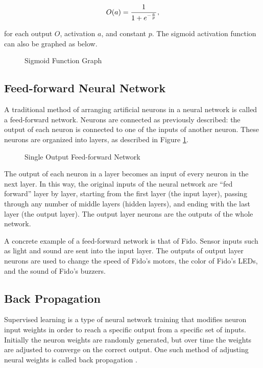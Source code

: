 \begin{equation}
	O(a) = \cfrac{1}{1+e^{-\frac{a}{p}}}
	\,,
\end{equation}

\noindent for each output $O$, activation $a$, and constant $p$. The sigmoid activation function can also be graphed as below.

\begin{figure}[ht]
	\centering
	
	\caption{Sigmoid Function Graph}
\end{figure}

\subsection{Feed-forward Neural Network}

A traditional method of arranging artificial neurons in a neural network is called a feed-forward network. Neurons are connected as previously described: the output of each neuron is connected to one of the inputs of another neuron. These neurons are organized into layers, as described in Figure \ref{fig:feedforward}.

\begin{figure}[ht]
	\centering
	
	\caption{Single Output Feed-forward Network}
	\label{fig:feedforward}
\end{figure}

The output of each neuron in a layer becomes an input of every neuron in the next layer. In this way, the original inputs of the neural network are ``fed forward'' layer by layer, starting from the first layer (the input layer), passing through any number of middle layers (hidden layers), and ending with the last layer (the output layer). The output layer neurons are the outputs of the whole network.

A concrete example of a feed-forward network is that of Fido. Sensor inputs such as light and sound are sent into the input layer. The outputs of output layer neurons are used to change the speed of Fido's motors, the color of Fido's LEDs, and the sound of Fido's buzzers.

\subsection{Back Propagation}

Supervised learning is a type of neural network training that modifies neuron input weights in order to reach a specific output from a specific set of inputs.  Initially the neuron weights are randomly generated, but over time the weights are adjusted to converge on the correct output.  One such method of adjusting neural weights is called back propagation \cite{werbos}.

